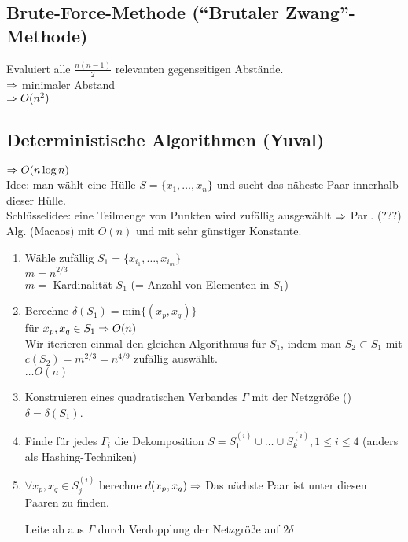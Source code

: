 \documentclass[a4paper,twoside,DIV15,BCOR12mm]{scrbook}
\begin{document}
\subsection{Brute-Force-Methode ("`Brutaler Zwang"'-Methode)}
Evaluiert alle $\frac{n(n-1)}{2}$ relevanten gegenseitigen Abstände.\\
$\Rightarrow$ minimaler Abstand\\
$\Rightarrow O(n^2)$\\

\subsection{Deterministische Algorithmen (Yuval)}
$\Rightarrow O(n \log n)$\\

Idee: man wählt eine Hülle $S=\{x_1, \ldots, x_n\}$ und sucht das näheste Paar innerhalb dieser Hülle.\\

Schlüsselidee: eine Teilmenge von Punkten wird zufällig ausgewählt
$\Rightarrow$ Parl. (???) Alg. (Macaos) mit $O(n)$ und mit sehr günstiger Konstante.

\begin{enumerate}
	\item Wähle zufällig $S_1 = \{x_{i_1}, \ldots, x_{i_m}\}$\\
				$m = n^{2/3}$\\ $m =$ Kardinalität $S_1$ (= Anzahl von Elementen in $S_1$)
	\item Berechne $\delta(S_1) = \text{min} \{(x_p, x_q)\}$\\
				für $x_p, x_q \in S_1 \Rightarrow O(n)$\\
				Wir iterieren einmal den gleichen Algorithmus für $S_1$, indem man $S_2 \subset S_1$ mit 
				$c(S_2)=m^{2/3}=n^{4/9}$ zufällig auswählt.\\ $\ldots O(n)$
	\item Konstruieren eines quadratischen Verbandes $\Gamma$ mit der Netzgröße () $\delta=\delta(S_1)$.
	

	\item Finde für jedes $\Gamma_i$ die Dekomposition $S = S^{(i)}_1 \cup \ldots \cup S^{(i)}_k, 1 \leq i \leq 4$
				(anders als Hashing-Techniken)
	\item $\forall x_p, x_q \in S^{(i)}_j$ berechne $d(x_p, x_q) \Rightarrow$ Das nächste Paar ist unter 
				diesen Paaren zu finden.

				Leite ab aus $\Gamma$ durch Verdopplung der Netzgröße auf $2\delta$
\end{enumerate}
\end{document}
